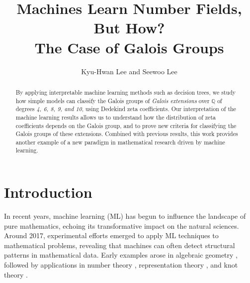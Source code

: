 \documentclass[letterpaper, 10pt]{article}
\newcommand{\1}{\mathds{1}}	%
\theoremstyle{definition}
\theoremstyle{remark}
\begin{document}

\title{Machines Learn Number Fields, But How? \\ The Case of Galois Groups}


\author{Kyu-Hwan Lee and Seewoo Lee}
\date{}


\maketitle



\begin{abstract}
By applying interpretable machine learning methods such as decision trees, we study how simple models can classify the Galois groups of \emph{Galois extensions} over $\mathbb{Q}$ of degrees \emph{4, 6, 8, 9, and 10}, using Dedekind zeta coefficients. Our interpretation of the machine learning results allows us to understand how the distribution of zeta coefficients depends on the Galois group, and to prove new criteria for classifying the Galois groups of these extensions. Combined with previous results, this work provides another example of a new paradigm in mathematical research driven by machine learning.
\end{abstract}



\section{Introduction}

In recent years, machine learning (ML) has begun to influence the landscape of pure mathematics, echoing its transformative impact on the natural sciences. Around 2017, experimental efforts emerged to apply ML techniques to mathematical problems, revealing that machines can often detect structural patterns in mathematical data. Early examples arose in algebraic geometry \cite{HE2017564,Carifio2017,Ruehle2017,Krefl2017}, followed by applications in number theory \cite{he2022machine, HLOa, HLOc, HLOP}, representation theory \cite{davies2021advancing, Kr}, and knot theory \cite{davies2021advancing}. 
\end{document}
